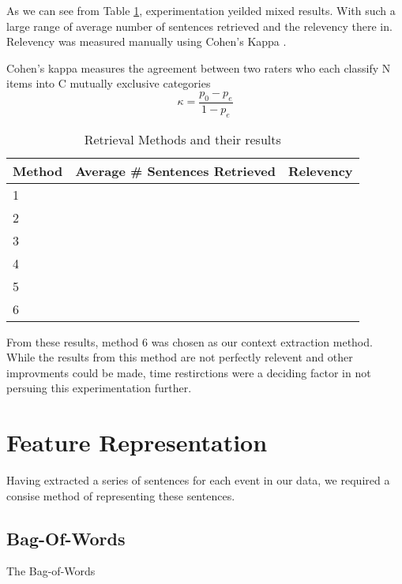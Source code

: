 \documentclass[bsc,frontabs,twoside,singlespacing,parskip,deptreport]{infthesis}     %
\begin{document}

As we can see from Table \ref{table:retrieval}, experimentation yeilded mixed results.
With such a large range of average number of sentences retrieved and the relevency there in.
Relevency was measured manually using Cohen's Kappa \cite{}.

Cohen's kappa measures the agreement between two raters who each classify N items into C mutually exclusive categories
\begin{equation}
  \kappa = \frac{p_{0} - p_{e}}{1 - p_{e}}
  \end{equation}

\begin{table}[h]
\centering
\caption{Retrieval Methods and their results}
\label{table:retrieval}
\begin{tabular}{|l|l|l|}
  \hline
Method & Average \# Sentences Retrieved & Relevency \\
\hline
1      &                                &           \\
2      &                                &           \\
3      &                                &           \\
4      &                                &           \\
5      &                                &           \\
6      &                                &           \\        
\hline
\end{tabular}
\end{table}

From these results, method 6 was chosen as our context extraction method. While the
results from this method are not perfectly relevent and other improvments could be made,
time restirctions were a deciding factor in not persuing this experimentation further.

\section{Feature Representation}
Having extracted a series of sentences for each event in our data, we required a consise method
of representing these sentences.
\subsection{Bag-Of-Words}
The Bag-of-Words 
\end{document}
